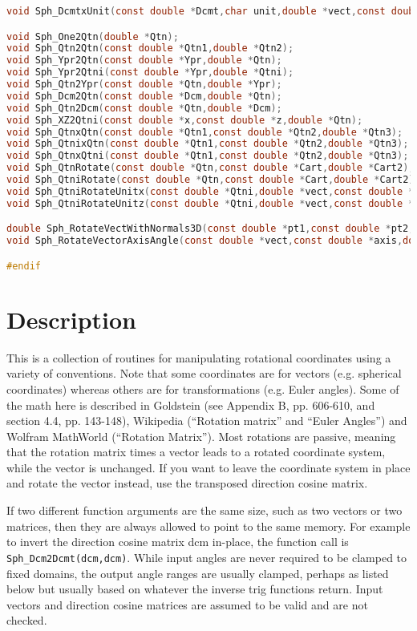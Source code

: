 \documentclass[11pt]{article}
\newcommand {\ttt} {\texttt}
\begin{document}
\begin{lstlisting}[language=C]
void Sph_DcmtxUnit(const double *Dcmt,char unit,double *vect,const double *add,double mult);

void Sph_One2Qtn(double *Qtn);
void Sph_Qtn2Qtn(const double *Qtn1,double *Qtn2);
void Sph_Ypr2Qtn(const double *Ypr,double *Qtn);
void Sph_Ypr2Qtni(const double *Ypr,double *Qtni);
void Sph_Qtn2Ypr(const double *Qtn,double *Ypr);
void Sph_Dcm2Qtn(const double *Dcm,double *Qtn);
void Sph_Qtn2Dcm(const double *Qtn,double *Dcm);
void Sph_XZ2Qtni(const double *x,const double *z,double *Qtn);
void Sph_QtnxQtn(const double *Qtn1,const double *Qtn2,double *Qtn3);
void Sph_QtnixQtn(const double *Qtn1,const double *Qtn2,double *Qtn3);
void Sph_QtnxQtni(const double *Qtn1,const double *Qtn2,double *Qtn3);
void Sph_QtnRotate(const double *Qtn,const double *Cart,double *Cart2);
void Sph_QtniRotate(const double *Qtn,const double *Cart,double *Cart2);
void Sph_QtniRotateUnitx(const double *Qtni,double *vect,const double *add,double mult);
void Sph_QtniRotateUnitz(const double *Qtni,double *vect,const double *add,double mult);

double Sph_RotateVectWithNormals3D(const double *pt1,const double *pt2,double *newpt2,double *oldnorm,double *newnorm,int sign);
void Sph_RotateVectorAxisAngle(const double *vect,const double *axis,double angle,double *rotated);

#endif
\end{lstlisting}

\section{Description}

This is a collection of routines for manipulating rotational coordinates using a variety of conventions. Note that some coordinates are for vectors (e.g. spherical coordinates) whereas others are for transformations (e.g. Euler angles). Some of the math here is described in Goldstein (see Appendix B, pp. 606-610, and section 4.4, pp. 143-148), Wikipedia (``Rotation matrix'' and ``Euler Angles'') and Wolfram MathWorld (``Rotation Matrix''). Most rotations are passive, meaning that the rotation matrix times a vector leads to a rotated coordinate system, while the vector is unchanged. If you want to leave the coordinate system in place and rotate the vector instead, use the transposed direction cosine matrix.

If two different function arguments are the same size, such as two vectors or two matrices, then they are always allowed to point to the same memory. For example to invert the direction cosine matrix dcm in-place, the function call is \ttt{Sph\_Dcm2Dcmt(dcm,dcm)}. While input angles are never required to be clamped to fixed domains, the output angle ranges are usually clamped, perhaps as listed below but usually based on whatever the inverse trig functions return. Input vectors and direction cosine matrices are assumed to be valid and are not checked.
\end{document}
